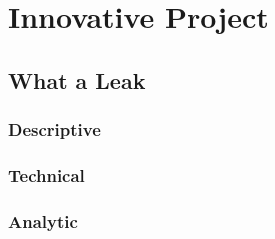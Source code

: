 \chapter{Innovative Project}

\section{What a Leak}
\subsection{Descriptive}
\subsection{Technical}
\subsection{Analytic}